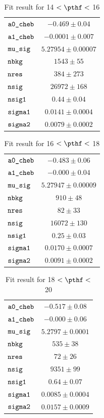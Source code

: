 \begin{table}[H]
    \centering
    \caption{Fit result for 14 $ < \pthf < $ 16}
    \label{tab:fit_results_pthf10}
\begin{tabular}{lc}
$\verb+a0_cheb+ $ & $ -0.469\pm 0.04$\\
$\verb+a1_cheb+ $ & $ -0.0001\pm 0.007$\\
$\verb+mu_sig+ $ & $  5.27954\pm 0.00007$\\
$\verb+nbkg+ $ & $  1543\pm 55$\\
$\verb+nres+ $ & $  384\pm 273$\\
$\verb+nsig+ $ & $  26972\pm 168$\\
$\verb+nsig1+ $ & $  0.44\pm 0.04$\\
$\verb+sigma1+ $ & $  0.0141\pm 0.0004$\\
$\verb+sigma2+ $ & $  0.0079\pm 0.0002$\\
\end{tabular}
\end{table}
\begin{table}[H]
    \centering
    \caption{Fit result for 16 $ < \pthf < $ 18}
    \label{tab:fit_results_pthf11}
\begin{tabular}{lc}
$\verb+a0_cheb+ $ & $ -0.483\pm 0.06$\\
$\verb+a1_cheb+ $ & $ -0.000\pm 0.04$\\
$\verb+mu_sig+ $ & $  5.27947\pm 0.00009$\\
$\verb+nbkg+ $ & $  910\pm 48$\\
$\verb+nres+ $ & $  82\pm 33$\\
$\verb+nsig+ $ & $  16072\pm 130$\\
$\verb+nsig1+ $ & $  0.25\pm 0.03$\\
$\verb+sigma1+ $ & $  0.0170\pm 0.0007$\\
$\verb+sigma2+ $ & $  0.0091\pm 0.0002$\\
\end{tabular}
\end{table}
\begin{table}[H]
    \centering
    \caption{Fit result for 18 $ < \pthf < $ 20}
    \label{tab:fit_results_pthf12}
\begin{tabular}{lc}
$\verb+a0_cheb+ $ & $ -0.517\pm 0.08$\\
$\verb+a1_cheb+ $ & $ -0.000\pm 0.06$\\
$\verb+mu_sig+ $ & $  5.2797\pm 0.0001$\\
$\verb+nbkg+ $ & $  535\pm 38$\\
$\verb+nres+ $ & $  72\pm 26$\\
$\verb+nsig+ $ & $  9351\pm 99$\\
$\verb+nsig1+ $ & $  0.64\pm 0.07$\\
$\verb+sigma1+ $ & $  0.0085\pm 0.0004$\\
$\verb+sigma2+ $ & $  0.0157\pm 0.0009$\\
\end{tabular}
\end{table}
